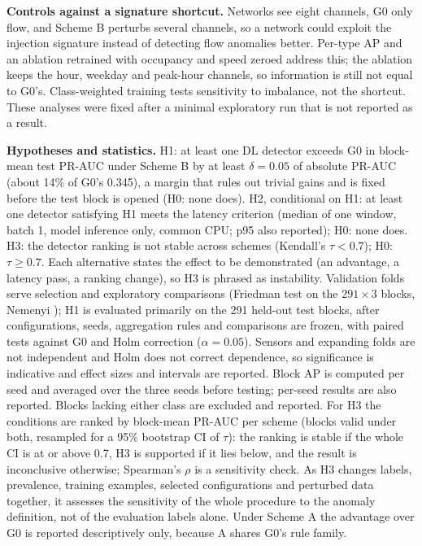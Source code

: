\documentclass[conference]{IEEEtran}
\begin{document}
\textbf{Controls against a signature shortcut.} Networks see eight
channels, G0 only flow, and Scheme B perturbs several channels, so a network
could exploit the injection signature instead of detecting flow anomalies
better. Per-type AP and an ablation retrained with occupancy and speed zeroed
address this; the ablation keeps the hour, weekday and peak-hour channels, so
information is still not equal to G0's. Class-weighted training tests
sensitivity to imbalance, not the shortcut. These analyses were fixed after a
minimal exploratory run that is not reported as a result.

\textbf{Hypotheses and statistics.} H1: at least one DL detector exceeds G0
in block-mean test PR-AUC under Scheme B by at least $\delta=0.05$ of
absolute PR-AUC (about 14\% of G0's 0.345), a margin that rules out trivial
gains and is fixed before the test block is opened (H0: none does). H2, conditional on H1: at least one detector
satisfying H1 meets the latency criterion (median of one window, batch 1,
model inference only, common CPU; p95 also reported); H0: none does. H3: the
detector ranking is not stable across schemes (Kendall's $\tau<0.7$); H0:
$\tau\geq0.7$. Each alternative states the effect to be demonstrated (an
advantage, a latency pass, a ranking change), so H3 is phrased as
instability. Validation folds serve selection and exploratory comparisons
(Friedman test on the $291\times3$ blocks, Nemenyi
\cite{demsar2006statistical}); H1 is evaluated primarily on the 291 held-out
test blocks, after configurations, seeds, aggregation rules and comparisons
are frozen, with paired tests against G0 and Holm correction
($\alpha=0.05$). Sensors and expanding folds are not independent and Holm
does not correct dependence, so significance is indicative and effect sizes
and intervals are reported. Block AP is computed per seed and averaged over
the three seeds before testing; per-seed results are also reported. Blocks
lacking either class are excluded and reported. For H3 the conditions are
ranked by block-mean PR-AUC per scheme (blocks valid under both, resampled
for a 95\% bootstrap CI of $\tau$): the ranking is stable if the whole CI is
at or above 0.7, H3 is supported if it lies below, and the result is
inconclusive otherwise; Spearman's $\rho$ is a sensitivity check. As H3
changes labels, prevalence, training examples, selected configurations and
perturbed data together, it assesses the sensitivity of the whole procedure
to the anomaly definition, not of the evaluation labels alone. Under
Scheme A the advantage over G0 is reported descriptively only, because A
shares G0's rule family.
\end{document}
